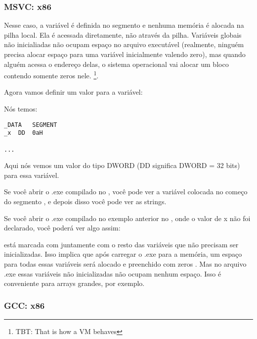 \subsubsection{MSVC: x86}



Nesse caso, a variável  é definida no segmento  e nenhuma memória é alocada na pilha local.
Ela é acessada diretamente, não através da pilha.
Variáveis globais não inicialiadas não ocupam espaço no arquivo executável 
(realmente, ninguém precisa alocar espaço para uma variável inicialmente valendo zero), 
mas quando alguém acessa o endereço delas, o sistema operacional vai alocar um bloco contendo somente zeros nele.
\footnote{\ac{TBT}: That is how a \ac{VM} behaves}.

Agora vamos definir um valor para a variável:



Nós temos:

\begin{lstlisting}[style=customasmx86]
_DATA	SEGMENT
_x	DD	0aH

...
\end{lstlisting}

Aqui nós vemos um valor  do tipo DWORD (DD significa DWORD = 32 bits) para essa variável.

Se você abrir o .exe compilado no \IDA, você pode ver a variável  colocada no começo do segmento ,
e depois disso você pode ver as strings.

Se você abrir o .exe compilado no exemplo anterior no \IDA, onde o valor de x não foi declarado, você poderá ver algo assim:



 está marcada com  juntamente com o resto das variáveis que não precisam ser inicializadas.
Isso implica que após carregar o .exe para a memória, um espaço para todas essas variáveis será alocado e preenchido com zeros .
Mas no arquivo .exe essas variáveis não inicializadas não ocupam nenhum espaço.
Isso é conveniente para arrays grandes, por exemplo.



\subsubsection{GCC: x86}

